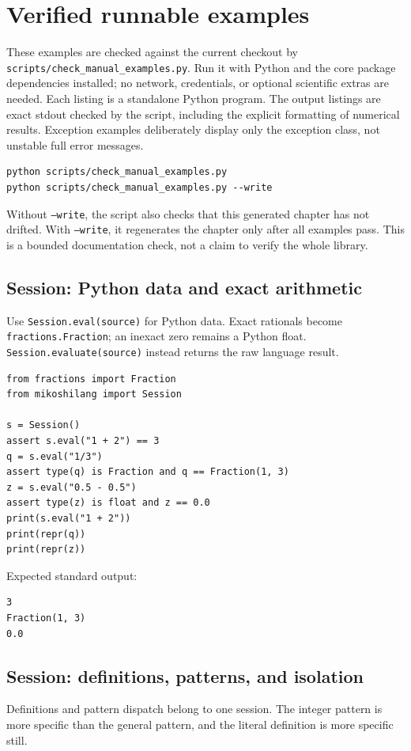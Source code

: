 \section{Verified runnable examples}
\label{chap:current-examples}
These examples are checked against the current checkout by \texttt{scripts/check\_manual\_examples.py}. Run it with Python and the core package dependencies installed; no network, credentials, or optional scientific extras are needed. Each listing is a standalone Python program. The output listings are exact stdout checked by the script, including the explicit formatting of numerical results. Exception examples deliberately display only the exception class, not unstable full error messages.

\begin{lstlisting}[style=mikoshi]
python scripts/check_manual_examples.py
python scripts/check_manual_examples.py --write
\end{lstlisting}
Without \texttt{--write}, the script also checks that this generated chapter has not drifted. With \texttt{--write}, it regenerates the chapter only after all examples pass. This is a bounded documentation check, not a claim to verify the whole library.

\subsection{Session: Python data and exact arithmetic}
Use \texttt{Session.eval(source)} for Python data. Exact rationals become \texttt{fractions.Fraction}; an inexact zero remains a Python float. \texttt{Session.evaluate(source)} instead returns the raw language result.

\begin{lstlisting}[style=mikoshi]
from fractions import Fraction
from mikoshilang import Session

s = Session()
assert s.eval("1 + 2") == 3
q = s.eval("1/3")
assert type(q) is Fraction and q == Fraction(1, 3)
z = s.eval("0.5 - 0.5")
assert type(z) is float and z == 0.0
print(s.eval("1 + 2"))
print(repr(q))
print(repr(z))
\end{lstlisting}
\noindent Expected standard output:
\begin{lstlisting}[style=mikoshi]
3
Fraction(1, 3)
0.0
\end{lstlisting}

\subsection{Session: definitions, patterns, and isolation}
Definitions and pattern dispatch belong to one session. The integer pattern is more specific than the general pattern, and the literal definition is more specific still.


